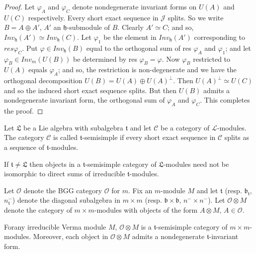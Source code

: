 \begin{proof}
Let $\varphi_A$ and $\varphi_C$ denote nondegenerate invariant forms
on $U(A)$ and $U(C)$ respectively. Every short exact sequence in
$\mathcal{J}$ splits. So we write $B = A \oplus A'$, $A'$ an
$\mathfrak{h}$-submodule of $B$. Clearly $A' \simeq C$; and so,
$Inv_\mathfrak{h} (A') \simeq Inv_\mathfrak{h}(C)$. Let $\varphi_1$ be
the element in $Inv_\mathfrak{h}(A')$ corresponding to $res
\varphi_C$. Put $\varphi\in Inv_\mathfrak{h}(B)$ equal to the
orthogonal sum of res $\varphi_A$ and $\varphi_1$; and let $\varphi_B
\in Inv_m(U(B))$ be determined by res $\varphi_B = \varphi$. Now
$\varphi_B $ restricted to $U(A)$ equals $\varphi_A$; and so, the
restriction is non-degenerate and we have the orthogonal decomposition
$U(B) = U(A) \oplus U(A)^\perp$. Then $U(A)^\perp \simeq U(C)$ and so
the induced short exact sequence splits. But then $U(B)$ admits a
nondegenerate invariant form, the orthogonal sum of $\varphi_A$ and
$\varphi_C$. This completes the proof.
\end{proof}

\begin{definition}\label{chap3:def3.8}%
Let $\mathfrak{L}$ be a Lie algebra with subalgebra $\mathfrak{t}$ and
let $\mathcal{C}$ be a category of $\mathcal{L}$-modules. The category
$\mathcal{C}$ is called $\mathfrak{t}$-semisimple if every short exact
sequence in $\mathcal{C}$ splits as a sequence of
$\mathfrak{t}$-modules. 
\end{definition}

\begin{note*}
If $\mathfrak{t} \neq \mathfrak{L}$ then objects in a
$\mathfrak{t}$-semisimple category of $\mathfrak{L}$-modules need not
be isomorphic to direct sums of irreducible $\mathfrak{t}$-modules.
\end{note*}

Let $\mathscr{O}$ denote the BGG category $\mathscr{O}$ for $m$. Fix
an $m$-module $M$ and let $\mathfrak{t}$
(resp. $\mathfrak{b}_\mathfrak{t}$, $n^-_\mathfrak{t}$) denote the
diagonal subalgebra in $m \times m$ (resp. $\mathfrak{b} \times
\mathfrak{b}$, $n^- \times n^-$). Let $\mathscr{O} \otimes M$ denote
the category of $m \times m$-modules with objects of the form $A
\otimes M$, $A \in \mathscr{O}$.

\begin{prop}\label{chap3:prop3.9}%
For\pageoriginale any irreducible Verma module $M$, $\mathscr{O}
\otimes M$ is a $\mathfrak{t}$-semisimple category of $m \times
m$-modules. Moreover, each object in $\mathscr{O} \otimes M$ admits a
nondegenerate  $\mathfrak{t}$-invariant form. 
\end{prop}

